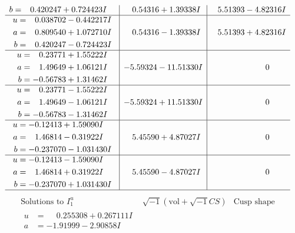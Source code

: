 \documentclass[1p]{elsarticle_modified}
\theoremstyle{definition}
\newcommand{\I}{\sqrt{-1}}
\begin{document}
$$\begin{array}{c|c|c}
\begin{aligned}
b &= \phantom{-}0.420247 + 0.724423 I\end{aligned}
 & \phantom{-}0.54316 + 1.39338 I & \phantom{-}5.51393 - 4.82316 I \\ \hline\begin{aligned}
u &= \phantom{-}0.038702 - 0.442217 I \\
a &= \phantom{-}0.809540 + 1.072710 I \\
b &= \phantom{-}0.420247 - 0.724423 I\end{aligned}
 & \phantom{-}0.54316 - 1.39338 I & \phantom{-}5.51393 + 4.82316 I \\ \hline\begin{aligned}
u &= \phantom{-}0.23771 + 1.55222 I \\
a &= \phantom{-}1.49649 + 1.06121 I \\
b &= -0.56783 + 1.31462 I\end{aligned}
 & -5.59324 - 11.51330 I & \phantom{-0.000000 } 0 \\ \hline\begin{aligned}
u &= \phantom{-}0.23771 - 1.55222 I \\
a &= \phantom{-}1.49649 - 1.06121 I \\
b &= -0.56783 - 1.31462 I\end{aligned}
 & -5.59324 + 11.51330 I & \phantom{-0.000000 } 0 \\ \hline\begin{aligned}
u &= -0.12413 + 1.59090 I \\
a &= \phantom{-}1.46814 - 0.31922 I \\
b &= -0.237070 - 1.031430 I\end{aligned}
 & \phantom{-}5.45590 + 4.87027 I & \phantom{-0.000000 } 0 \\ \hline\begin{aligned}
u &= -0.12413 - 1.59090 I \\
a &= \phantom{-}1.46814 + 0.31922 I \\
b &= -0.237070 + 1.031430 I\end{aligned}
 & \phantom{-}5.45590 - 4.87027 I & \phantom{-0.000000 } 0\\
 \hline 
 \end{array}$$\newpage$$\begin{array}{c|c|c}  
\text{Solutions to }I^u_{1}& \I (\text{vol} + \sqrt{-1}CS) & \text{Cusp shape}\\
 \hline 
\begin{aligned}
u &= \phantom{-}0.255308 + 0.267111 I \\
a &= -1.91999 - 2.90858 I \\

\end{aligned}
\end{array}$$
\end{document}
